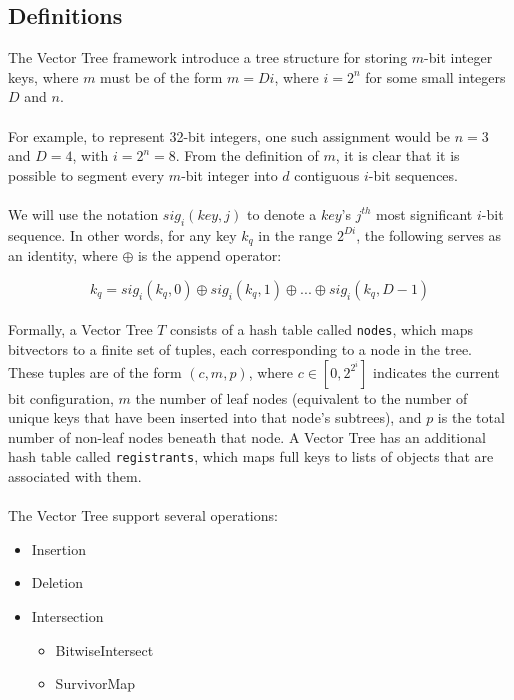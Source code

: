 \documentclass[11pt,letterpaper]{article}
\begin{document}
\subsection{Definitions}

The Vector Tree framework introduce a tree structure for storing
$m$-bit integer keys, where $m$ must be of the form $m=Di$,
where $i=2^n$ for some small integers $D$ and $n$.

\paragraph{}
For example, to represent 32-bit integers, one such assignment
would be $n=3$ and $D=4$, with $i=2^n=8$.  From the definition of
$m$, it is clear that it is possible to segment every $m$-bit integer
into $d$ contiguous $i$-bit sequences.

\paragraph{}
We will use the notation $sig_i(key, j)$ to denote a $key$'s
$j^{th}$ most significant $i$-bit sequence.  In other words,
for any key $k_q$ in the range $2^{Di}$, the following serves as
an identity, where $\oplus$ is the append operator:

\[ k_q = sig_i(k_q, 0) \oplus sig_i(k_q, 1) \oplus ... \oplus sig_i(k_q, D-1) \]

\paragraph{}
Formally, a Vector Tree $T$ consists of a hash table called
{\tt nodes}, which maps bitvectors to a finite set of tuples, each
corresponding to a node in the tree.  These tuples are of the form $(c, m, p)$,
where $c \in [0, 2^{2^i}]$ indicates the current bit configuration,
$m$ the number of leaf nodes (equivalent to the number of unique
keys that have been inserted into that node's subtrees), and $p$
is the total number of non-leaf nodes beneath that node.  A Vector
Tree has an additional hash table called {\tt registrants}, which maps
full keys to lists of objects that are associated with them.

\paragraph{}
The Vector Tree support several operations:

\begin{itemize}
	\item Insertion
	\item Deletion
	\item Intersection
		\begin{itemize}
			\item BitwiseIntersect
			\item SurvivorMap
		\end{itemize}
\end{itemize}
\end{document}
